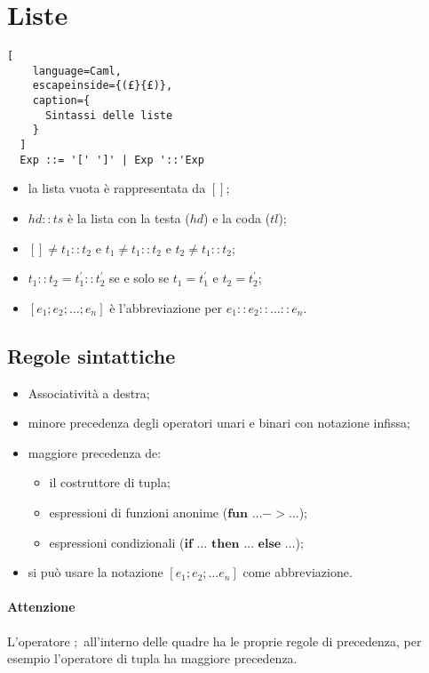 \clearpage
\section{Liste}
\begin{lstlisting}[
    language=Caml,
    escapeinside={(£}{£)},
    caption={
      Sintassi delle liste
    }
  ]
  Exp ::= '[' ']' | Exp '::'Exp
\end{lstlisting}

\begin{itemize}
  \item la lista vuota è rappresentata da $[]$;
  \item $hd::ts$ è la lista con la testa ($hd$) e la coda ($tl$);
  \item $[]\neq t_1::t_2$ e $t_1\neq t_1::t_2$ e $t_2\neq t_1::t_2$;
  \item $t_1::t_2=t_1^\prime::t_2^\prime$ se e solo se $t_1=t_1^\prime$ e $t_2
    =t_2^\prime$;
  \item $[e_1;e_2;\dots;e_n]$ è l'abbreviazione per $e_1::e_2::\dots::e_n$.
\end{itemize}

\subsection{Regole sintattiche}
\begin{itemize}
  \item Associatività a destra;
  \item minore precedenza degli operatori unari e binari con notazione infissa;
  \item maggiore precedenza de:
    \begin{itemize}
      \item il costruttore di tupla;
      \item espressioni di funzioni anonime ($\textbf{fun }\dots->\dots$);
      \item espressioni condizionali ($ \textbf{if }\dots \textbf{ then }\dots
        \textbf{ else }\dots$);
    \end{itemize}
  \item si può usare la notazione $[e_1;e_2;\dots e_n]$ come abbreviazione.
\end{itemize}

\paragraph{Attenzione}
L'operatore $;$ all'interno delle quadre ha le proprie regole di precedenza,
per esempio l'operatore di tupla ha maggiore precedenza.

